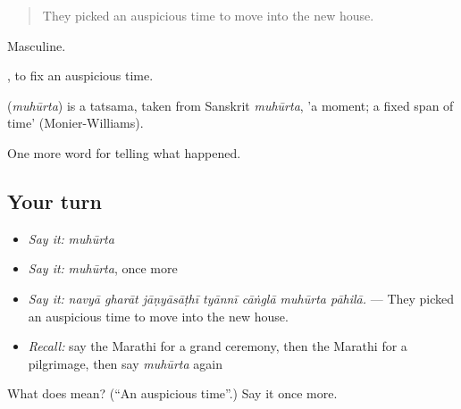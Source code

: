 \begin{quote}
They picked an auspicious time to move into the new house.
\end{quote}

Masculine.

 , to fix an auspicious time.

\begin{cousinweb}
\textbf{} (\emph{muhūrta}) is a tatsama, taken from Sanskrit \emph{muhūrta}, 'a moment; a fixed span of time' (Monier-Williams).
\end{cousinweb}

\begin{grammarlens}[title={What you've built}]
One more word for telling what happened.
\end{grammarlens}

\subsection*{Your turn}
\begin{itemize}
\raggedright
  \item \emph{Say it:} \emph{muhūrta}
  \item \emph{Say it:} \emph{muhūrta}, once more
  \item \emph{Say it:} \emph{navyā gharāt jāṇyāsāṭhī tyānnī cāṅglā muhūrta pāhilā.} — They picked an auspicious time to move into the new house.
  \item \emph{Recall:} say the Marathi for a grand ceremony, then the Marathi for a pilgrimage, then say \emph{muhūrta} again
\end{itemize}

\begin{tcolorbox}[breakable,colback=teal!4,colframe=teal!35!black,title={Before you move on}]
What does  mean? (\textquotedblleft{}An auspicious time\textquotedblright{}.) Say it once more.
\end{tcolorbox}
